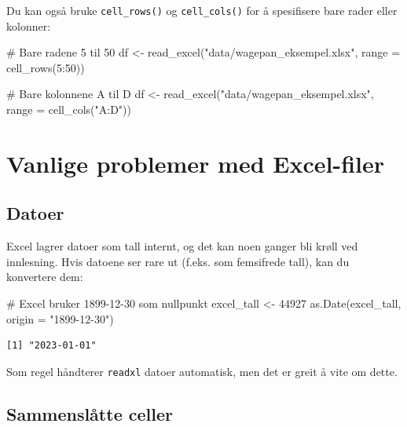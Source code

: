 \documentclass[
  norsk,
  letterpaper,
  DIV=11,
  numbers=noendperiod]{scrreprt}
\newenvironment{Shaded}{\begin{snugshade}}{\end{snugshade}}
\newcommand{\AttributeTok}[1]{\textcolor[rgb]{0.40,0.45,0.13}{#1}}
\newcommand{\CommentTok}[1]{\textcolor[rgb]{0.37,0.37,0.37}{#1}}
\newcommand{\DecValTok}[1]{\textcolor[rgb]{0.68,0.00,0.00}{#1}}
\newcommand{\FunctionTok}[1]{\textcolor[rgb]{0.28,0.35,0.67}{#1}}
\newcommand{\NormalTok}[1]{\textcolor[rgb]{0.00,0.23,0.31}{#1}}
\newcommand{\OtherTok}[1]{\textcolor[rgb]{0.00,0.23,0.31}{#1}}
\newcommand{\SpecialCharTok}[1]{\textcolor[rgb]{0.37,0.37,0.37}{#1}}
\newcommand{\StringTok}[1]{\textcolor[rgb]{0.13,0.47,0.30}{#1}}
\theoremstyle{definition}
\theoremstyle{remark}
\begin{document}
Du kan også bruke \texttt{cell\_rows()} og \texttt{cell\_cols()} for å
spesifisere bare rader eller kolonner:

\begin{Shaded}
\begin{Highlighting}[]
\CommentTok{\# Bare radene 5 til 50}
\NormalTok{df }\OtherTok{\textless{}{-}} \FunctionTok{read\_excel}\NormalTok{(}\StringTok{"data/wagepan\_eksempel.xlsx"}\NormalTok{, }\AttributeTok{range =} \FunctionTok{cell\_rows}\NormalTok{(}\DecValTok{5}\SpecialCharTok{:}\DecValTok{50}\NormalTok{))}

\CommentTok{\# Bare kolonnene A til D}
\NormalTok{df }\OtherTok{\textless{}{-}} \FunctionTok{read\_excel}\NormalTok{(}\StringTok{"data/wagepan\_eksempel.xlsx"}\NormalTok{, }\AttributeTok{range =} \FunctionTok{cell\_cols}\NormalTok{(}\StringTok{"A:D"}\NormalTok{))}
\end{Highlighting}
\end{Shaded}

\section{Vanlige problemer med
Excel-filer}\label{vanlige-problemer-med-excel-filer}

\subsection{Datoer}\label{datoer}

Excel lagrer datoer som tall internt, og det kan noen ganger bli krøll
ved innlesning. Hvis datoene ser rare ut (f.eks. som femsifrede tall),
kan du konvertere dem:

\begin{Shaded}
\begin{Highlighting}[]
\CommentTok{\# Excel bruker 1899{-}12{-}30 som nullpunkt}
\NormalTok{excel\_tall }\OtherTok{\textless{}{-}} \DecValTok{44927}
\FunctionTok{as.Date}\NormalTok{(excel\_tall, }\AttributeTok{origin =} \StringTok{"1899{-}12{-}30"}\NormalTok{)}
\end{Highlighting}
\end{Shaded}

\begin{verbatim}
[1] "2023-01-01"
\end{verbatim}

Som regel håndterer \texttt{readxl} datoer automatisk, men det er greit
å vite om dette.

\subsection{Sammenslåtte celler}\label{sammensluxe5tte-celler}
\end{document}
